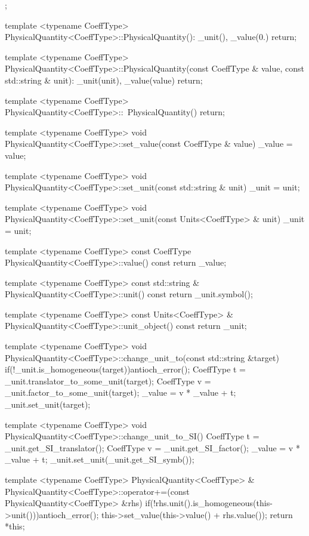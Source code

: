 \begin{cpp}[\tiny]
{{  };

  template <typename CoeffType>
  PhysicalQuantity<CoeffType>::PhysicalQuantity():
        _unit(),
        _value(0.)
  {
     return;
  }

  template <typename CoeffType>
  PhysicalQuantity<CoeffType>::PhysicalQuantity(const CoeffType & value, const std::string & unit):
        _unit(unit),
        _value(value)
  {
     return;
  }

  template <typename CoeffType>
  PhysicalQuantity<CoeffType>::~PhysicalQuantity()
  {
     return;
  }

  template <typename CoeffType>
  void PhysicalQuantity<CoeffType>::set_value(const CoeffType & value)
  {
     _value = value;
  }

  template <typename CoeffType>
  void PhysicalQuantity<CoeffType>::set_unit(const std::string & unit)
  {
     _unit = unit;
  }

  template <typename CoeffType>
  void PhysicalQuantity<CoeffType>::set_unit(const Units<CoeffType> & unit)
  {
     _unit = unit;
  }

  template <typename CoeffType>
  const CoeffType PhysicalQuantity<CoeffType>::value() const
  {
     return _value;
  }

  template <typename CoeffType>
  const std::string & PhysicalQuantity<CoeffType>::unit() const
  {
     return _unit.symbol();
  }

  template <typename CoeffType>
  const Units<CoeffType> & PhysicalQuantity<CoeffType>::unit_object() const
  {
     return _unit;
  }

  template <typename CoeffType>
  void PhysicalQuantity<CoeffType>::change_unit_to(const std::string &target)
  {
      if(!_unit.is_homogeneous(target))antioch_error();
      CoeffType t = _unit.translator_to_some_unit(target);
      CoeffType v = _unit.factor_to_some_unit(target);
      _value = v * _value + t;
      _unit.set_unit(target);
  }

  template <typename CoeffType>
  void PhysicalQuantity<CoeffType>::change_unit_to_SI()
  {
      CoeffType t = _unit.get_SI_translator();
      CoeffType v = _unit.get_SI_factor();
      _value = v * _value + t;
      _unit.set_unit(_unit.get_SI_symb());
  }

  template <typename CoeffType>
  PhysicalQuantity<CoeffType> & 
        PhysicalQuantity<CoeffType>::operator+=(const PhysicalQuantity<CoeffType> &rhs)
  {
     if(!rhs.unit().is_homogeneous(this->unit()))antioch_error();
     this->set_value(this->value() + rhs.value());
     return *this;
  }

}
\end{cpp}
